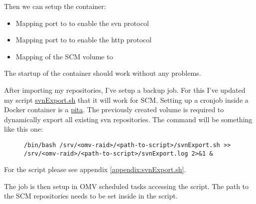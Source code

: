 Then we can setup the container:

\begin{itemize}
    \item Mapping port  to  to enable the \gls{svn} protocol
    \item Mapping port  to  to enable the http protocol
    \item Mapping of the \gls{SCM} volume to 
\end{itemize}



The startup of the container should work without any problems.


After importing my repositories, I've setup a backup job. For this I've updated
my script \href{https://github.com/ThirtySomething/NAS}{svnExport.sh} that it
will work for \gls{SCM}. Setting up a cronjob inside a \gls{Docker} container
is a \href{https://en.wiktionary.org/wiki/pain_in_the_ass}{pita}. The previously
created volume is required to dynamically export all existing \gls{svn}
repositories. The command will be something like this one:

\begin{figure}[H]
    \scriptsize
    \centering
    \begin{BVerbatim}
/bin/bash /srv/<omv-raid>/<path-to-script>/svnExport.sh >>
/srv/<omv-raid>/<path-to-script>/svnExport.log 2>&1 &
    \end{BVerbatim}
\end{figure}

For the script please see appendix \ref{appendix:svnExport.sh}.
\bigbreak

The job is then setup in \gls{OMV} scheduled tasks accessing the script.
 The path to the \gls{SCM} repositories needs to be set
inside in the script.

